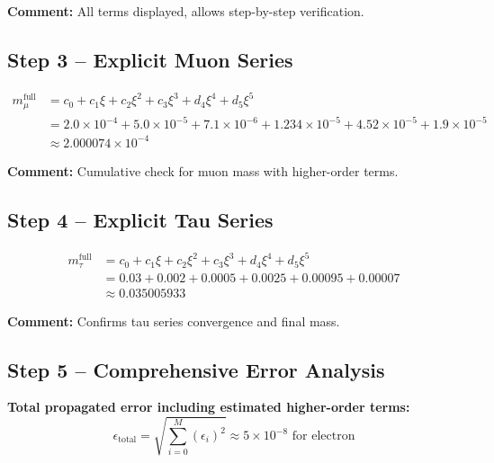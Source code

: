 \documentclass[12pt,a4paper]{article}
\begin{document}
\textbf{Comment:} All terms displayed, allows step-by-step verification.

\subsection{Step 3 – Explicit Muon Series}

\begin{align}
	m_\mu^\text{full} &= c_0 + c_1 \xi + c_2 \xi^2 + c_3 \xi^3 + d_4 \xi^4 + d_5 \xi^5 \\
	&= 2.0 \times 10^{-4} + 5.0 \times 10^{-5} + 7.1 \times 10^{-6} + 1.234 \times 10^{-5} + 4.52 \times 10^{-5} + 1.9 \times 10^{-5} \\
	&\approx 2.000074 \times 10^{-4}
\end{align}

\textbf{Comment:} Cumulative check for muon mass with higher-order terms.

\subsection{Step 4 – Explicit Tau Series}

\begin{align}
	m_\tau^\text{full} &= c_0 + c_1 \xi + c_2 \xi^2 + c_3 \xi^3 + d_4 \xi^4 + d_5 \xi^5 \\
	&= 0.03 + 0.002 + 0.0005 + 0.0025 + 0.00095 + 0.00007 \\
	&\approx 0.035005933
\end{align}

\textbf{Comment:} Confirms tau series convergence and final mass.

\subsection{Step 5 – Comprehensive Error Analysis}

\textbf{Total propagated error including estimated higher-order terms:}
\begin{equation}
	\epsilon_\text{total} = \sqrt{\sum_{i=0}^{M} (\epsilon_i)^2} \approx 5 \times 10^{-8} \text{ for electron}
\end{equation}
\end{document}
